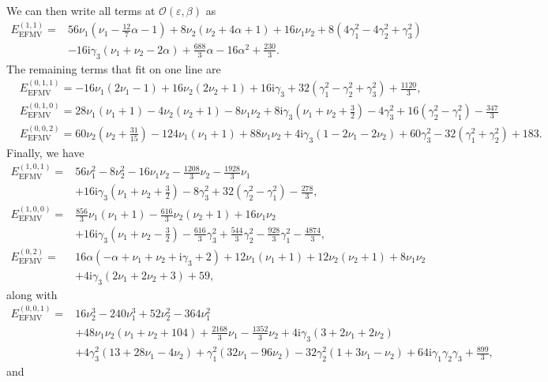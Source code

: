 \documentclass{article}
\def \ag {\alpha}
\def \cg {\gamma}
\begin{document}
We can then write all terms at $\mathcal{O}(\varepsilon,\beta)$ as
\begin{align*}
E_{\mathrm{EFMV}}^{(1,1)} =& 56 \nu_1(\nu_1-\frac{12}{7}\ag -1) + 8 \nu_2(\nu_2+4\ag+1) + 16\nu_1\nu_2 + 8 ( 4\cg_1^2-4\cg_2^2+\cg_3^2)    \\
&-16 \mathrm{i}\cg_3(\nu_1+\nu_2-2\ag)+\frac{688}{3} \ag -16 \ag^2 +\frac{230}{3}.
\end{align*}
The remaining terms that fit on one line are 
\begin{align*}
& E_{\mathrm{EFMV}}^{(0,1,1)} =  -16 \nu_1(2\nu_1-1) +16\nu_2(2\nu_2+1) +16\mathrm{i}\cg_3 + 32(\cg_1^2-\cg_2^2+\cg_3^2) +\frac{1120}{3}, \\
& E_{\mathrm{EFMV}}^{(0,1,0)}  = 28\nu_1(\nu_1+1)-4\nu_2(\nu_2+1) -8\nu_1\nu_2 +8 \mathrm{i}\cg_3(\nu_1+\nu_2 + \frac{3}{2})  -4 \cg_3^2 + 16(\cg_2^2-\cg_1^2) -\frac{347}{3} \\
 & E_{\mathrm{EFMV}}^{(0,0,2)} =  60 \nu_2(\nu_2+\frac{31}{15}) -124 \nu_1( \nu_1+1)+88\nu_1\nu_2 +4\mathrm{i}\cg_3(1-2\nu_1-2\nu_2) +60 \cg_3^2 - 32(\cg_1^2+\cg_2^2) +183.
\end{align*}
Finally, we have
\begin{align*}
 E_{\mathrm{EFMV}}^{(1,0,1)} =& 56\nu_1^2 -8 \nu_2^2 -16 \nu_1\nu_2 - \frac{1208}{3} \nu_2 - \frac{1928}{3} \nu_1\\
&+16 \mathrm{i}\cg_3(\nu_1+\nu_2+ \frac{3}{2}) -8\cg_3^2 + 32(\cg_2^2-\cg_1^2) - \frac{278}{3}, \\
 E_{\mathrm{EFMV}}^{(1,0,0)} =& \frac{856}{3} \nu_1(\nu_1+1) - \frac{616}{3} \nu_2(\nu_2+1) +16\nu_1\nu_2 \\
&+16 \mathrm{i}\cg_3(\nu_1+\nu_2-\frac{3}{2}) -\frac{616}{3} \cg_3^2 + \frac{544}{3}\cg_2^2 - \frac{928}{3} \cg_1^2 - \frac{4874}{3}, \\
 E_{\mathrm{EFMV}}^{(0,2)} =&    16\ag\left( -\ag + \nu_1+\nu_2+\mathrm{i}\cg_3+2 \right) +12\nu_1(\nu_1+1) +12\nu_2(\nu_2+1) + 8\nu_1\nu_2\\
& +4\mathrm{i}\cg_3(2\nu_1+2\nu_2+3) + 59,
\end{align*}
along with 
\begin{align*}
    E_{\mathrm{EFMV}}^{(0,0,1)}  =& 16\nu_2^3 -240 \nu_1^3+52 \nu_2^2-364 \nu_1^2  \\
    &+  48 \nu_1\nu_2(\nu_1+\nu_2 +104)+\frac{2168}{3} \nu_1 - \frac{1352}{3} \nu_2+  4\mathrm{i}\cg_3(3+2\nu_1+2\nu_2) \\
&  + 4 \cg_3^2(13 + 28\nu_1-4\nu_2) + \cg_1^2(32 \nu_1-96\nu_2) -32\cg_2^2(1+3\nu_1-\nu_2) + 64 \mathrm{i}\cg_1\cg_2\cg_3 + \frac{899}{3},
\end{align*}
and 
\end{document}
